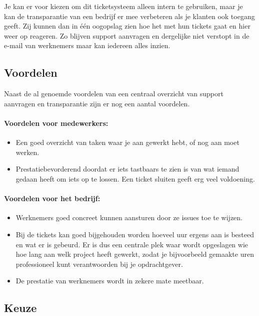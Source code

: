 Je kan er voor kiezen om dit ticketsysteem alleen intern te gebruiken, maar je kan de transparantie van een bedrijf er mee verbeteren als je klanten ook toegang geeft. Zij kunnen dan in één oogopslag zien hoe het met hun tickets gaat en hier weer op reageren. Zo blijven support aanvragen en dergelijke niet verstopt in de e-mail van werknemers maar kan iedereen alles inzien. 

\subsection{Voordelen}

Naast de al genoemde voordelen van een centraal overzicht van support aanvragen en transparantie zijn er nog een aantal voordelen.

\paragraph{Voordelen voor medewerkers:}

\begin{itemize}
  \item Een goed overzicht van taken waar je aan gewerkt hebt, of nog aan moet werken.
  \item Prestatiebevorderend doordat er iets tastbaars te zien is van wat iemand gedaan heeft om iets op te lossen. Een ticket sluiten geeft erg veel voldoening.
\end{itemize}

\paragraph{Voordelen voor het bedrijf:}

\begin{itemize}
  \item Werknemers goed concreet kunnen aansturen door ze issues toe te wijzen.
  \item Bij de tickets kan goed bijgehouden worden hoeveel uur ergens aan is besteed en wat er is gebeurd. Er is dus een centrale plek waar wordt opgeslagen wie hoe lang aan welk project heeft gewerkt, zodat je bijvoorbeeld gemaakte uren professioneel kunt verantwoorden bij je opdrachtgever.
  \item De prestatie van werknemers wordt in zekere mate meetbaar.
\end{itemize}

\subsection{Keuze}

